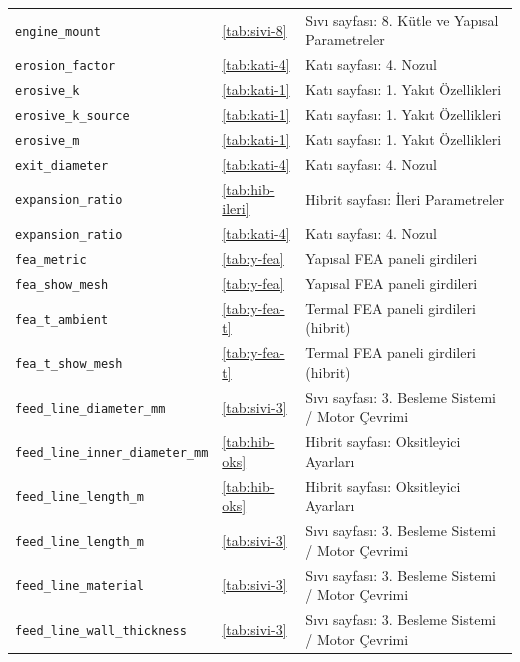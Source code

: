 \documentclass[11pt,a4paper]{article}
\begin{document}
{\begin{longtable}{@{}>{\raggedright\arraybackslash}p{5.2cm}p{1.4cm}>{\raggedright\arraybackslash}p{7.4cm}@{}}
\texttt{engine\_\allowbreak{}mount} & \ref{tab:sivi-8} & Sıvı sayfası: 8. Kütle ve Yapısal Parametreler \\
\texttt{erosion\_\allowbreak{}factor} & \ref{tab:kati-4} & Katı sayfası: 4. Nozul \\
\texttt{erosive\_\allowbreak{}k} & \ref{tab:kati-1} & Katı sayfası: 1. Yakıt Özellikleri \\
\texttt{erosive\_\allowbreak{}k\_\allowbreak{}source} & \ref{tab:kati-1} & Katı sayfası: 1. Yakıt Özellikleri \\
\texttt{erosive\_\allowbreak{}m} & \ref{tab:kati-1} & Katı sayfası: 1. Yakıt Özellikleri \\
\texttt{exit\_\allowbreak{}diameter} & \ref{tab:kati-4} & Katı sayfası: 4. Nozul \\
\texttt{expansion\_\allowbreak{}ratio} & \ref{tab:hib-ileri} & Hibrit sayfası: İleri Parametreler \\
\texttt{expansion\_\allowbreak{}ratio} & \ref{tab:kati-4} & Katı sayfası: 4. Nozul \\
\texttt{fea\_\allowbreak{}metric} & \ref{tab:y-fea} & Yapısal FEA paneli girdileri \\
\texttt{fea\_\allowbreak{}show\_\allowbreak{}mesh} & \ref{tab:y-fea} & Yapısal FEA paneli girdileri \\
\texttt{fea\_\allowbreak{}t\_\allowbreak{}ambient} & \ref{tab:y-fea-t} & Termal FEA paneli girdileri (hibrit) \\
\texttt{fea\_\allowbreak{}t\_\allowbreak{}show\_\allowbreak{}mesh} & \ref{tab:y-fea-t} & Termal FEA paneli girdileri (hibrit) \\
\texttt{feed\_\allowbreak{}line\_\allowbreak{}diameter\_\allowbreak{}mm} & \ref{tab:sivi-3} & Sıvı sayfası: 3. Besleme Sistemi / Motor Çevrimi \\
\texttt{feed\_\allowbreak{}line\_\allowbreak{}inner\_\allowbreak{}diameter\_\allowbreak{}mm} & \ref{tab:hib-oks} & Hibrit sayfası: Oksitleyici Ayarları \\
\texttt{feed\_\allowbreak{}line\_\allowbreak{}length\_\allowbreak{}m} & \ref{tab:hib-oks} & Hibrit sayfası: Oksitleyici Ayarları \\
\texttt{feed\_\allowbreak{}line\_\allowbreak{}length\_\allowbreak{}m} & \ref{tab:sivi-3} & Sıvı sayfası: 3. Besleme Sistemi / Motor Çevrimi \\
\texttt{feed\_\allowbreak{}line\_\allowbreak{}material} & \ref{tab:sivi-3} & Sıvı sayfası: 3. Besleme Sistemi / Motor Çevrimi \\
\texttt{feed\_\allowbreak{}line\_\allowbreak{}wall\_\allowbreak{}thickness} & \ref{tab:sivi-3} & Sıvı sayfası: 3. Besleme Sistemi / Motor Çevrimi \\

\end{longtable}}
\end{document}

